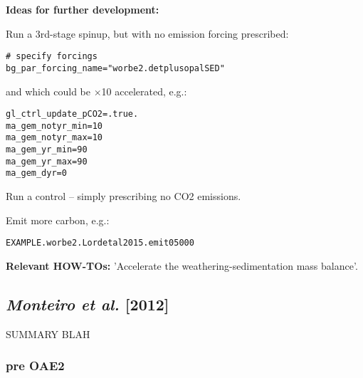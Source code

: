 \documentclass[10pt,twoside]{article}
\begin{document}
\noindent \textbf{Ideas for further development:}
\begin{compactenum}
\item Run a 3rd-stage spinup, but with no emission forcing prescribed:
\vspace{-10pt}\begin{verbatim}
# specify forcings
bg_par_forcing_name="worbe2.detplusopalSED"
\end{verbatim}\vspace{-10pt}
and which could be \(\times\)10 accelerated, e.g.:
\vspace{-10pt}\begin{verbatim}
gl_ctrl_update_pCO2=.true.
ma_gem_notyr_min=10
ma_gem_notyr_max=10
ma_gem_yr_min=90
ma_gem_yr_max=90
ma_gem_dyr=0
\end{verbatim}\vspace{-10pt}
\item Run a control -- simply prescribing no CO2 emissions.
\item Emit more carbon, e.g.:
\vspace{-10pt}\begin{verbatim}EXAMPLE.worbe2.Lordetal2015.emit05000\end{verbatim}\vspace{-10pt}
\end{compactenum}  

\noindent \textbf{Relevant HOW-TOs:} 'Accelerate the weathering-sedimentation mass balance'.


\subsection{\textit{Monteiro et al.} [2012]}

SUMMARY BLAH


\subsubsection{pre OAE2}\label{EXAMPLE.p0093k.Monteiroetal2012 PREOAE2.SPIN}
\end{document}
